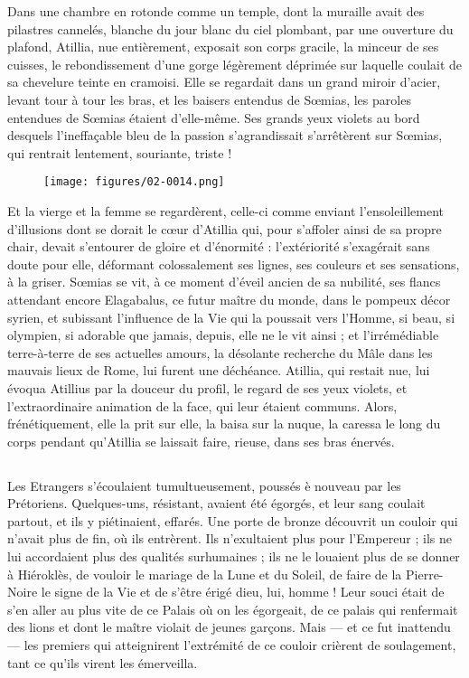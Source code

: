 \documentclass[a4paper, 11pt, oneside, polutonikogreek, french]{article}
\begin{document}
Dans une chambre en rotonde comme un temple, dont la muraille avait des pilastres cannelés, blanche du jour blanc du ciel plombant, par une ouverture du plafond, Atillia, nue entièrement, exposait son corps gracile, la minceur de ses cuisses, le rebondissement d'une gorge légèrement déprimée sur laquelle coulait de sa chevelure teinte en cramoisi. Elle se regardait dans un grand miroir d'acier, levant tour à tour les bras, et les baisers entendus de Sœmias, les paroles entendues de Sœmias étaient d'elle-même. Ses grands yeux violets au bord desquels l'ineffaçable bleu de la passion s'agrandissait s'arrêtèrent sur Sœmias, qui rentrait lentement, souriante, triste !
\begin{figure}[H]
\centering
\texttt{[image: figures/02-0014.png]}
\end{figure}
Et la vierge et la femme se regardèrent, celle-ci comme enviant l'ensoleillement d'illusions dont se dorait le cœur d'Atillia qui, pour s'affoler ainsi de sa propre chair, devait s'entourer de gloire et d'énormité : l'extériorité s'exagérait sans doute pour elle, déformant colossalement ses lignes, ses couleurs et ses sensations, à la griser. Sœmias se vit, à ce moment d'éveil ancien de sa nubilité, ses flancs attendant encore Elagabalus, ce futur maître du monde, dans le pompeux décor syrien, et subissant l'influence de la Vie qui la poussait vers l'Homme, si beau, si olympien, si adorable que jamais, depuis, elle ne le vit ainsi ; et l'irrémédiable terre-à-terre de ses actuelles amours, la désolante recherche du Mâle dans les mauvais lieux de Rome, lui furent une déchéance. Atillia, qui restait nue, lui évoqua Atillius par la douceur du profil, le regard de ses yeux violets, et l'extraordinaire animation de la face, qui leur étaient communs. Alors, frénétiquement, elle la prit sur elle, la baisa sur la nuque, la caressa le long du corps pendant qu'Atillia se laissait faire, rieuse, dans ses bras énervés.
\clearpage
\subsection{}
\paragraph{}
Les Etrangers s'écoulaient tumultueusement, poussés è nouveau par les Prétoriens. Quelques-uns, résistant, avaient été égorgés, et leur sang coulait partout, et ils y piétinaient, effarés. Une porte de bronze découvrit un couloir qui n'avait plus de fin, où ils entrèrent. Ils n'exultaient plus pour l'Empereur ; ils ne lui accordaient plus des qualités surhumaines ; ils ne le louaient plus de se donner à Hiéroklès, de vouloir le mariage de la Lune et du Soleil, de faire de la Pierre-Noire le signe de la Vie et de s'être érigé dieu, lui, homme ! Leur souci était de s'en aller au plus vite de ce Palais où on les égorgeait, de ce palais qui renfermait des lions et dont le maître violait de jeunes garçons. Mais --- et ce fut inattendu --- les premiers qui atteignirent l'extrémité de ce couloir crièrent de soulagement, tant ce qu'ils virent les émerveilla.
\end{document}
